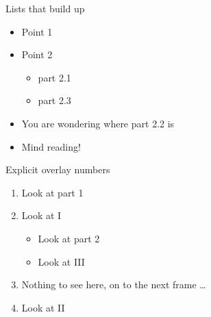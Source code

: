 \documentclass[aspectratio=169,11pt]{beamer}
\begin{document}
\begin{frame}{Lists that build up}
    \begin{itemize}
        \item Point 1 \pause
        \item Point 2 \pause
        \begin{itemize}
            \item part 2.1
            \item part 2.3
        \end{itemize} \pause
        \item You are wondering where part 2.2 is
        \item Mind reading!
    \end{itemize}
\end{frame}

%
%
\begin{frame}{Explicit overlay numbers}
    \begin{enumerate}[I]
        \item<3->  Look at part 1
        \item<2->  Look at I
        \begin{itemize}
            \item<3-> Look at part 2
            \item<4-> Look at III
        \end{itemize}
        \item<5->  Nothing to see here, on to the next frame \dots
        \item<1-2> Look at II          %
    \end{enumerate}
\end{frame}
\end{document}
